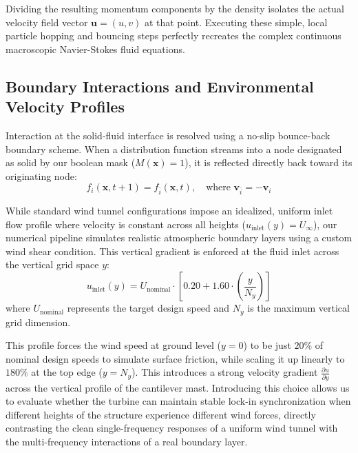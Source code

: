 \documentclass[11pt,a4paper]{article}
\begin{document}
Dividing the resulting momentum components by the density isolates the actual velocity field vector $\mathbf{u} = (u,v)$ at that point. Executing these simple, local particle hopping and bouncing steps perfectly recreates the complex continuous macroscopic Navier-Stokes fluid equations.

\subsection{Boundary Interactions and Environmental Velocity Profiles}
Interaction at the solid-fluid interface is resolved using a no-slip bounce-back boundary scheme. When a distribution function streams into a node designated as solid by our boolean mask ($M(\mathbf{x})=1$), it is reflected directly back toward its originating node:
\begin{equation}
f_i(\mathbf{x}, t+1) = f_{\bar{i}}(\mathbf{x}, t), \quad \text{where } \mathbf{v}_{\bar{i}} = -\mathbf{v}_i
\end{equation}

While standard wind tunnel configurations impose an idealized, uniform inlet flow profile where velocity is constant across all heights ($u_{\text{inlet}}(y) = U_{\infty}$), our numerical pipeline simulates realistic atmospheric boundary layers using a custom wind shear condition. This vertical gradient is enforced at the fluid inlet across the vertical grid space $y$:
\begin{equation}
u_{\text{inlet}}(y) = U_{\text{nominal}} \cdot \left[ 0.20 + 1.60 \cdot \left(\frac{y}{N_y}\right) \right]
\end{equation}
where $U_{\text{nominal}}$ represents the target design speed and $N_y$ is the maximum vertical grid dimension. 

This profile forces the wind speed at ground level ($y=0$) to be just $20\%$ of nominal design speeds to simulate surface friction, while scaling it up linearly to $180\%$ at the top edge ($y=N_y$). This introduces a strong velocity gradient $\frac{\partial u}{\partial y}$ across the vertical profile of the cantilever mast. Introducing this choice allows us to evaluate whether the turbine can maintain stable lock-in synchronization when different heights of the structure experience different wind forces, directly contrasting the clean single-frequency responses of a uniform wind tunnel with the multi-frequency interactions of a real boundary layer.

\end{document}
